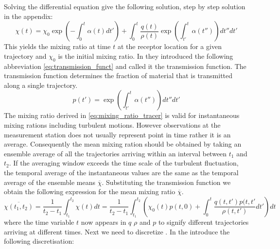 Solving the differential equation give the following solution, step by step solution in the appendix:
\begin{equation}\label{eq:mixing_ratio_tracer}
    \chi(t) = \chi_0 \exp{\left(-\int_0^t \alpha(t)dt'\right)} + \int_0^t \frac{q(t)}{\rho(t)}\exp{\left(\int_{t'}^t\alpha(t'')\right)dt''}dt'
\end{equation}
This yields the mixing ratio at time $t$ at the receptor location for a given trajectory and $\chi_0$ is the initial mixing ratio. In \parencite{seibert2004source} they introduced the following abbreviation \cref{eq:transmission_funct} and called it the transmission function. The transmission function determines the fraction of material that is transmitted along a single trajectory.   
\begin{equation}\label{eq:transmission_funct}
    p(t') = \exp{\left(\int_{t'}^t\alpha(t'')\right)dt''}dt'
\end{equation} 
The mixing ratio derived in \cref{eq:mixing_ratio_tracer} is valid for instantaneous mixing rations including turbulent motions. However observations at the measurement station does not usually represent point in time rather it is an average. Consequently the mean mixing ration should be obtained by taking an ensemble average of all the trajectories arriving within an interval between $t_1$ and $t_2$. If the averaging window exceeds the time scale of the turbulent fluctuation, the temporal average of the instantaneous values are the same as the temporal average of the ensemble means $\overline{\chi}$. Substituting the transmission function we obtain the following expression for the mean mixing ratio $\overline{\chi}$. 
\begin{equation}\label{eq:ensemble_mix_ratio}
    \overline{\chi(t_1, t_2)} = \frac{1}{t_2-t_1}\int_{t_1}^{t_2} \chi(t)dt = \frac{1}{t_2-t_1}\int_{t_1}^{t_2} \left(\chi_0(t)p(t,0)+\int_0^t \frac{q(t,t')p(t,t'}{\rho(t,t')}dt'\right)dt
\end{equation}
where the time variable $t$ now appears in $q$ $\rho$ and $p$ to signify different trajectories arriving at different times. Next we need to discretize . In \textcite{seibert2004source} the introduce the following discretisation:

